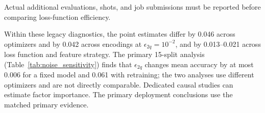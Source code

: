 \begin{table}[H]
  \centering
  \caption{Supplementary loss-function diagnostic (Breast Cancer, $n=8$, $L=2$, Adam, $\epsilon_{2q}=10^{-2}$)}
  \label{tab:ablation_loss}
  \small
  \setlength{\tabcolsep}{4pt}
  \begin{tablenotes}
    \small
    \item Actual additional evaluations, shots, and job submissions must be reported before comparing loss-function efficiency.
  \end{tablenotes}
\end{table}
\FloatBarrier

Within these legacy diagnostics, the point estimates differ by 0.046 across optimizers and by 0.042 across encodings at $\epsilon_{2q}=10^{-2}$, and by 0.013--0.021 across loss function and feature strategy. The primary 15-split analysis (Table~\ref{tab:noise_sensitivity}) finds that $\epsilon_{2q}$ changes mean accuracy by at most 0.006 for a fixed model and 0.061 with retraining; the two analyses use different optimizers and are not directly comparable. Dedicated causal studies can estimate factor importance. The primary deployment conclusions use the matched primary evidence.